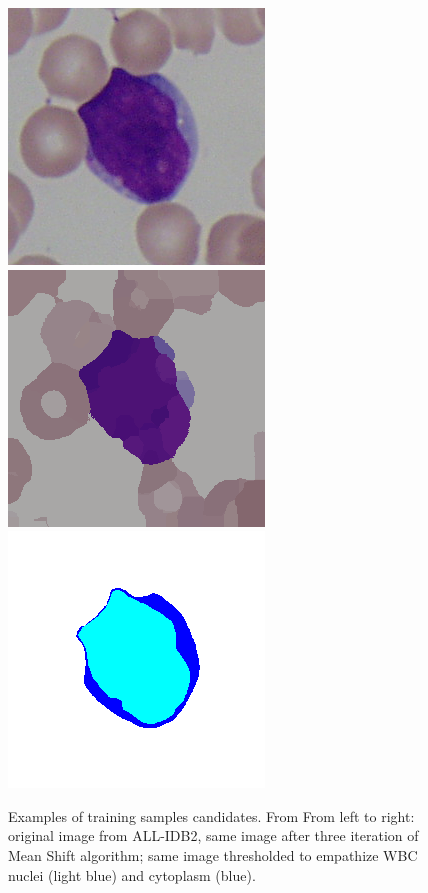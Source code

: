 \documentclass[final,a4paper,12pt,english]{UnicaPhdThesis3}
\begin{document}
	\begin{figure}[!b]
		\centering
		\includegraphics[height=0.10\textheight]{images/2015_2_iciap/Im002_1}
		\includegraphics[height=0.10\textheight]{images/2015_2_iciap/Im002_1_MS}
		\includegraphics[height=0.10\textheight]{images/2015_2_iciap/Im002_1_T}
		\caption{\label{fig:svm_candidates} Examples of training samples candidates. From From left to right: original image from ALL-IDB2, same image after three iteration of Mean Shift algorithm; same image thresholded to empathize WBC nuclei (light blue) and cytoplasm (blue).}
	\end{figure}
	
\end{document}
